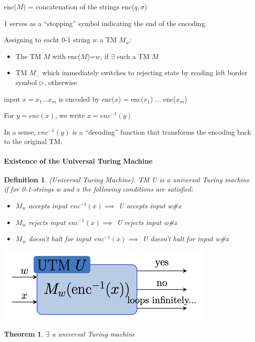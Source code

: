 \documentclass[a3paper, 8pt]{extarticle}
\newtheorem{theorem}{Theorem}[section]
\newtheorem*{definition}{Definition}
\begin{document}
\begin{multicols*}{6}
enc($M$) = concatenation of the strings enc($q, \sigma$)

1 serves as
a “stopping” symbol indicating the end of the encoding.

Assigning to eacht 0-1 string $w$ a TM $M_w$:
\begin{itemize}
    \item The TM $M$ with enc($M$)=$w$, if $\exists$ such a TM $M$
    \item TM $M_-$ which immediately switches to rejecting state by reading left border symbol $\rhd$, otherwise
\end{itemize}

input $x=x_1 ... x_m$ is encoded by enc($x$) = enc($x_1$) ... enc($x_m$)

For $y = enc(x)$, we write $x=enc^{-1}(y)$

In a sense, $enc^{-1}(y)$ is a “decoding” function that transforms the encoding back to the original TM.

\paragraph{Existence of the Universal Turing Machine}

\begin{definition}
    (Universal Turing Machine).  TM U is a universal Turing machine if for 0-1-strings w and x the following conditions are satisfied: \begin{itemize}
        \item $M_w$ accepts input enc$^{-1}(x) \implies$ U accepts input w\#x
        \item $M_w$ rejects input enc$^{-1}(x) \implies$ U rejects input w\#x
        \item $M_w$ doesn't halt for input enc$^{-1}(x) \implies$ U doesn't halt for input w\#x
    \end{itemize}
\end{definition}

\begin{center}
    \includegraphics[width=0.5\columnwidth]{images/Screen Shot 2022-12-29 at 16.36.30.png}
\end{center}

\begin{theorem}
    $\exists$ a universal Turing machine 
\end{theorem}


\end{multicols*}
\end{document}
